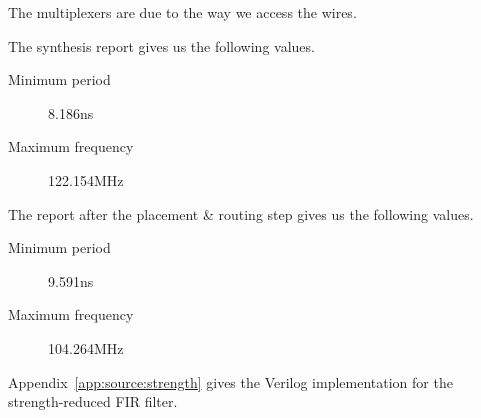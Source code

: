 The multiplexers are due to the way we access the wires.

The synthesis report gives us the following values.
\begin{description}
	\item[Minimum period] 8.186ns
	\item[Maximum frequency] 122.154MHz
\end{description}

The report after the placement \& routing step gives us the following values.
\begin{description}
	\item[Minimum period] 9.591ns
	\item[Maximum frequency] 104.264MHz
\end{description}

\strengthfilter
Appendix~\ref{app:source:strength} gives the Verilog implementation for the strength-reduced FIR filter.
